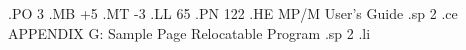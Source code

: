 .PO 3
.MB +5
.MT -3
.LL 65
.PN 122
.HE MP/M User's Guide
.sp 2
.ce
APPENDIX G:  Sample Page Relocatable Program
.sp 2
.li

